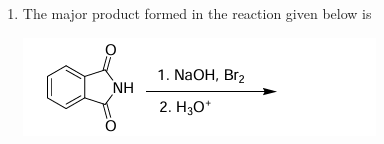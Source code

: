 \documentclass[journal,12pt,onecolumn]{IEEEtran}
\theoremstyle{remark}
\begin{document}
\begin{enumerate}
\begin{enumerate}
\end{enumerate}
\hfill \textbf{}


\item The major product formed in the reaction given below is
    \begin{center} 
       
        \includegraphics[width=0.6\columnwidth]{figs/q21.png}
    \end{center}
    \begin{enumerate}
        \begin{multicols}{2}
      

\end{multicols}
\end{enumerate}
\end{enumerate}
\end{document}
